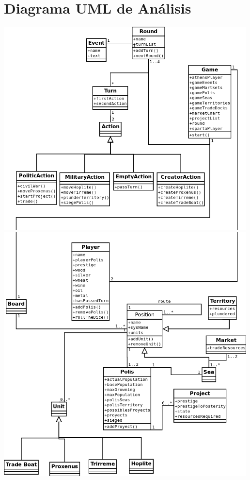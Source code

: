 \documentclass[11 pt]{book}
\begin{document}
	\section{Diagrama UML de Análisis}
		\begin{center}
			\includegraphics[width=500px]{analysis-uml/iteration3/part1.png}
			\includegraphics[width=500px]{analysis-uml/iteration3/part2.png}
		\end{center}
\end{document}
